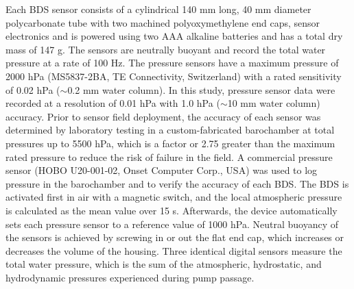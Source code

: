 \documentclass[fleqn,10pt]{wlscirep}
\begin{document}
Each BDS sensor consists of a cylindrical 140 mm long, 40 mm diameter polycarbonate tube with two machined polyoxymethylene end caps, sensor electronics and is powered using two AAA alkaline batteries and has a total dry mass of 147 g. The sensors are neutrally buoyant and record the total water pressure at a rate of 100 Hz. The pressure sensors have a maximum pressure of 2000 hPa (MS5837-2BA, TE Connectivity, Switzerland) with a rated sensitivity of 0.02 hPa ($\sim$0.2 mm water column). In this study, pressure sensor data were recorded at a resolution of 0.01 hPa with 1.0 hPa ($\sim$10 mm water column) accuracy. Prior to sensor field deployment, the accuracy of each sensor was determined by laboratory testing in a custom-fabricated barochamber at total pressures up to 5500 hPa, which is a factor or 2.75 greater than the maximum rated pressure to reduce the risk of failure in the field. A commercial pressure sensor (HOBO U20-001-02, Onset Computer Corp., USA) was used to log pressure in the barochamber and to verify the accuracy of each BDS. The BDS is activated first in air with a magnetic switch, and the local atmospheric pressure is calculated as the mean value over 15 s. Afterwards, the device automatically sets each pressure sensor to a reference value of 1000 hPa. Neutral buoyancy of the sensors is achieved by screwing in or out the flat end cap, which increases or decreases the volume of the housing. Three identical digital sensors measure the total water pressure, which is the sum of the atmospheric, hydrostatic, and hydrodynamic pressures experienced during pump passage.  %

\end{document}
